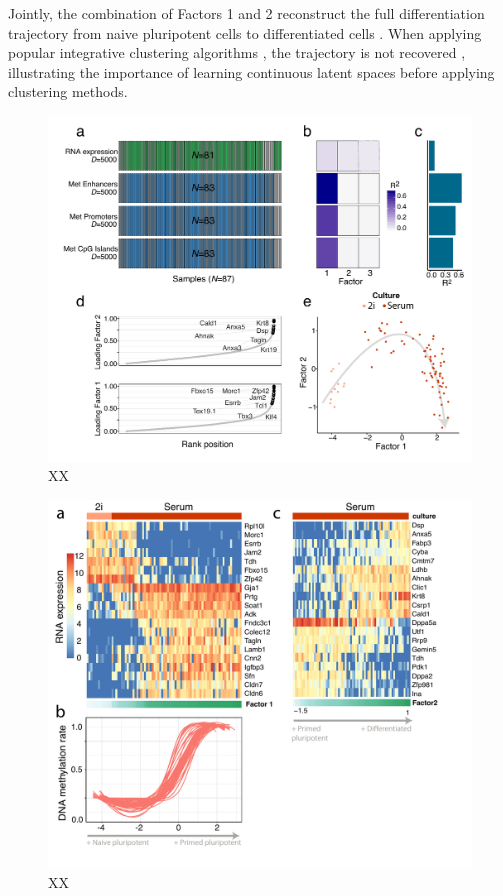 Jointly, the combination of Factors 1 and 2 reconstruct the full differentiation trajectory from naive pluripotent cells to differentiated cells . When applying popular integrative clustering algorithms \cite{Wang2014,Shen2009,Moi2013}, the trajectory is not recovered , illustrating the importance of learning continuous latent spaces before applying clustering methods.

\begin{figure}[H]
	\centering 	
	\includegraphics[width=1.0\textwidth]{MOFA_scMT}
	\caption{XX}
	\label{fig:MOFA_scMT}
\end{figure}

\begin{figure}[H]
	\centering 	
	\includegraphics[width=1.0\textwidth]{MOFA_scMT2}
	\caption{XX}
	\label{fig:MOFA_scMT2}
\end{figure}

